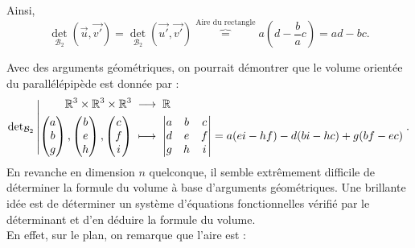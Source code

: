 \documentclass{book}
\begin{document}
\begin{Exemple}
\begin{Demonstration}
\begin{itemize}
\begin{itemize}
\begin{center}
\end{center}
Ainsi, 
$$\det_{\mathcal{B}_2} (\vec{u},\vec{v'})=\det_{\mathcal{B}_2} (\vec{u'},\vec{v'})\overbrace{=}^{\text{Aire du rectangle}}a(d-\frac{b}{a}c)=ad-bc.$$
\end{itemize}
\end{itemize}
\end{Demonstration}
Avec des arguments géométriques, on pourrait démontrer  que le volume  orientée du parallélépipède est donnée par :  
$$
{\mathop{\mathrm{det}}\nolimits_{\mathcal{B}_2}}\left|\begin{aligned}{\mathbb{R}^3\times\mathbb{R}^3\times\mathbb{R}^3}&\;\longrightarrow\;{\mathbb{R}}\\{\begin{pmatrix}
a\\b\\g
\end{pmatrix},\begin{pmatrix}
b\\e\\h
\end{pmatrix},\begin{pmatrix}
c\\f\\i
\end{pmatrix}}&\;\longmapsto\;{\begin{vmatrix}
a & b &c \\
d & e &f \\
g & h &i\\
\end{vmatrix}=a(ei-hf)-d(bi-hc)+g(bf-ec) }\end{aligned}\right..
$$
En revanche en  dimension $n$ quelconque, il semble extrêmement difficile de déterminer la formule du volume à base d'arguments géométriques. Une brillante idée est  de déterminer un système d'équations fonctionnelles vérifié par le déterminant et d'en déduire la formule du volume. \\
En effet,  sur le plan, on remarque que l'aire est :

\end{Exemple}
\end{document}
